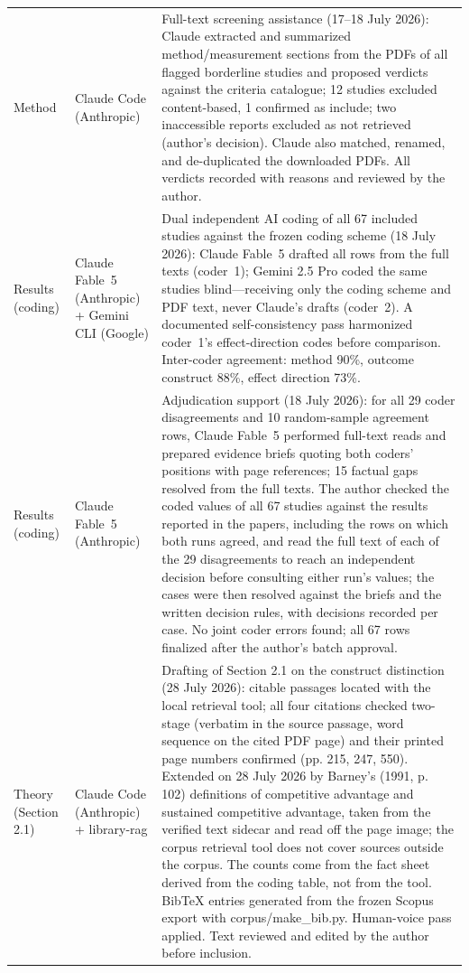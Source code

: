 \begin{longtable}{@{}p{2.9cm}p{3.2cm}p{9.0cm}@{}}
\addlinespace
Method & Claude Code (Anthropic) & Full-text screening assistance (17--18 July 2026): Claude extracted and summarized method/measurement sections from the PDFs of all flagged borderline studies and proposed verdicts against the criteria catalogue; 12 studies excluded content-based, 1 confirmed as include; two inaccessible reports excluded as not retrieved (author's decision). Claude also matched, renamed, and de-duplicated the downloaded PDFs. All verdicts recorded with reasons and reviewed by the author. \\
\addlinespace
Results (coding) & Claude Fable~5 (Anthropic) + Gemini CLI (Google) & Dual independent AI coding of all 67 included studies against the frozen coding scheme (18 July 2026): Claude Fable~5 drafted all rows from the full texts (coder~1); Gemini 2.5 Pro coded the same studies blind---receiving only the coding scheme and PDF text, never Claude's drafts (coder~2). A documented self-consistency pass harmonized coder~1's effect-direction codes before comparison. Inter-coder agreement: method 90\%, outcome construct 88\%, effect direction 73\%. \\
\addlinespace
Results (coding) & Claude Fable~5 (Anthropic) & Adjudication support (18 July 2026): for all 29 coder disagreements and 10 random-sample agreement rows, Claude Fable~5 performed full-text reads and prepared evidence briefs quoting both coders' positions with page references; 15 factual gaps resolved from the full texts. The author checked the coded values of all 67 studies against the results reported in the papers, including the rows on which both runs agreed, and read the full text of each of the 29 disagreements to reach an independent decision before consulting either run's values; the cases were then resolved against the briefs and the written decision rules, with decisions recorded per case. No joint coder errors found; all 67 rows finalized after the author's batch approval. \\
\addlinespace
Theory (Section 2.1) & Claude Code (Anthropic) + library-rag & Drafting of Section 2.1 on the construct distinction (28 July 2026): citable passages located with the local retrieval tool; all four citations checked two-stage (verbatim in the source passage, word sequence on the cited PDF page) and their printed page numbers confirmed (pp. 215, 247, 550). Extended on 28 July 2026 by Barney's (1991, p. 102) definitions of competitive advantage and sustained competitive advantage, taken from the verified text sidecar and read off the page image; the corpus retrieval tool does not cover sources outside the corpus. The counts come from the fact sheet derived from the coding table, not from the tool. BibTeX entries generated from the frozen Scopus export with corpus/make\_bib.py. Human-voice pass applied. Text reviewed and edited by the author before inclusion. \\

\end{longtable}
